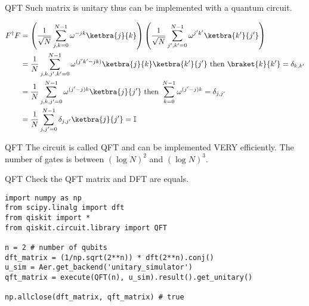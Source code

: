 
\begin{frame}{QFT}
Such matrix is \alert{unitary} thus can be implemented with a quantum circuit. 

\begin{align*}
    F^\dagger F 
    & = 
    \left(\frac{1}{\sqrt{N}} \sum_{j, k=0}^{N-1} \omega^{-jk} \ketbra{j}{k} \right)
    \left(\frac{1}{\sqrt{N}} \sum_{j', k'=0}^{N-1} \omega^{j'k'} \ketbra{k'}{j'} \right) \\
    & = 
    \frac{1}{N}
    \sum_{j, k, j', k'=0}^{N-1} \omega^{(j'k'-jk)} \ketbra{j}{k}\ketbra{k'}{j'} \text{ then } \braket{k}{k'} = \delta_{k, k'}\\
    & = 
    \frac{1}{N}
    \sum_{j, k, j'=0}^{N-1} \omega^{(j'-j)k} \ketbra{j}{j'} \text{ then } \sum_{k=0}^{N-1} \omega^{(j'-j)k} = \delta_{j, j'} \\
    & = 
    \frac{1}{N}
    \sum_{j,j'=0}^{N-1} \delta_{j, j'} \ketbra{j}{j'} = \mathbb{I}
\end{align*}
\end{frame}


\begin{frame}{QFT}
The circuit is called \alert{QFT} and can be implemented \alert{VERY} efficiently. The number of gates is between \((\log N)^2\) and \((\log N)^3\).
\end{frame}


\begin{frame}[fragile]{QFT}
Check the QFT matrix and DFT are equals.

\bigskip
\begin{verbatim}
import numpy as np
from scipy.linalg import dft
from qiskit import *
from qiskit.circuit.library import QFT

n = 2 # number of qubits
dft_matrix = (1/np.sqrt(2**n)) * dft(2**n).conj()
u_sim = Aer.get_backend('unitary_simulator')
qft_matrix = execute(QFT(n), u_sim).result().get_unitary()

np.allclose(dft_matrix, qft_matrix) # true
\end{verbatim}
\end{frame}



